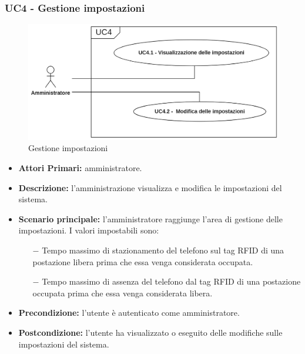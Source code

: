 \subsubsection{ UC4 - Gestione impostazioni}

\begin{figure}[H]
	\centering
	\includegraphics[width=15cm]{res/images/UC4.png}
	\caption{Gestione impostazioni}
	\label{fig:Gestione impostazioni}
\end{figure}
\begin{itemize}
           	\item\textbf{Attori Primari:} 
           	amministratore.
           	\item\textbf{Descrizione:} 
           	l'amministrazione visualizza e modifica le impostazioni del sistema.
           	\item\textbf{Scenario principale:}
           	l'amministratore raggiunge l'area di gestione delle impostazioni.
           	I valori impostabili sono:
           	\begin{itemize}
           		\item[$-$] Tempo massimo di stazionamento del telefono sul tag RFID di una postazione libera prima che essa venga considerata occupata.
           		\item[$-$] Tempo massimo di assenza del telefono dal tag RFID di una postazione occupata prima che essa venga considerata libera.
           	\end{itemize}
           	\item\textbf{Precondizione:} 
           	l'utente è autenticato come amministratore.
           	\item\textbf{Postcondizione:}
           	l'utente ha visualizzato o eseguito delle modifiche sulle impostazioni del sistema.
\end{itemize}

